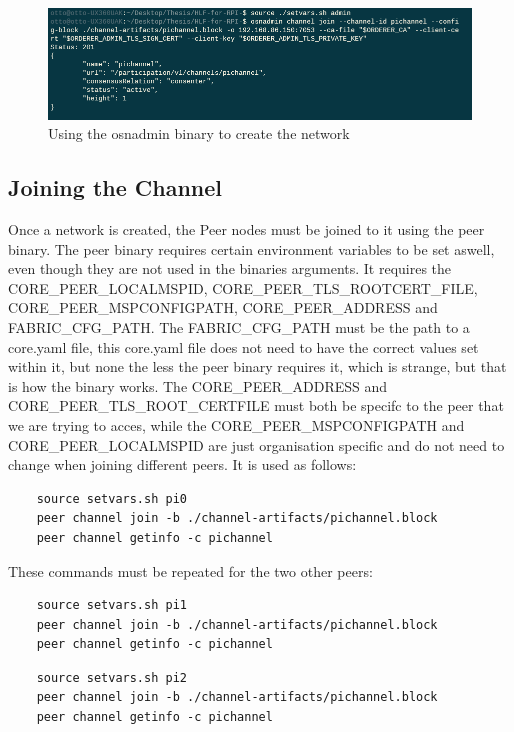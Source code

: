 \begin{figure}
    \centering
    \includegraphics{osnadmin.PNG}
    \caption{Using the osnadmin binary to create the network}
    \label{fig:my_label}
\end{figure}



\subsection{Joining the Channel}
Once a network is created, the Peer nodes must be joined to it using the peer binary. The peer binary requires certain environment variables to be set aswell, even though they are not used in the binaries arguments. It requires the CORE\_PEER\_LOCALMSPID, CORE\_PEER\_TLS\_ROOTCERT\_FILE, CORE\_PEER\_MSPCONFIGPATH, CORE\_PEER\_ADDRESS and  FABRIC\_CFG\_PATH. The  FABRIC\_CFG\_PATH must be the path to a core.yaml file, this core.yaml file does not need to have the correct values set within it, but none the less the peer binary requires it, which is strange, but that is how the binary works. The CORE\_PEER\_ADDRESS and CORE\_PEER\_TLS\_ROOT\_CERTFILE must both be specifc to the peer that we are trying to acces, while the CORE\_PEER\_MSPCONFIGPATH and CORE\_PEER\_LOCALMSPID are just organisation specific and do not need to change when joining different peers. It is used as follows:

\begin{verbatim}
    source setvars.sh pi0
    peer channel join -b ./channel-artifacts/pichannel.block 
    peer channel getinfo -c pichannel
\end{verbatim}

These commands must be repeated for the two other peers:

\begin{verbatim}
    source setvars.sh pi1
    peer channel join -b ./channel-artifacts/pichannel.block 
    peer channel getinfo -c pichannel
\end{verbatim}

\begin{verbatim}
    source setvars.sh pi2
    peer channel join -b ./channel-artifacts/pichannel.block 
    peer channel getinfo -c pichannel
\end{verbatim}

